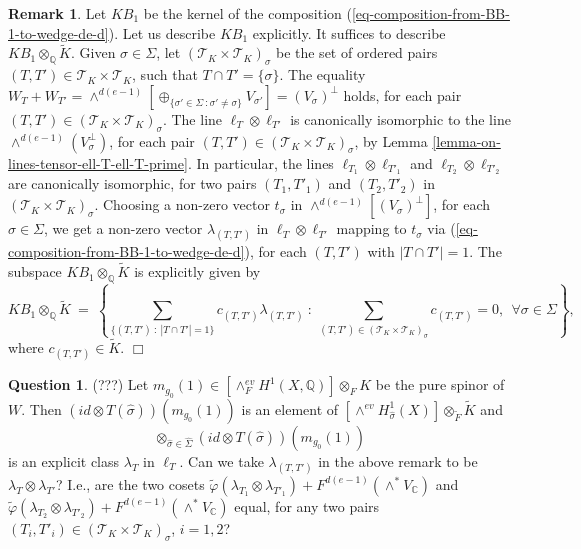 \documentclass[12pt]{amsart}
\numberwithin{equation}{subsection}
\theoremstyle{plain}
\theoremstyle{definition}
\newtheorem{rem}[thm]{Remark}
\newtheorem{question}[thm]{Question}
\newcommand{\CC}{{\mathbb C}}
\newcommand{\QQ}{{\mathbb Q}}
\newcommand{\T}{{\mathcal T}}
\newcommand{\EndProof}{\hfill  $\Box$}
\begin{document}
{\begin{rem}
Let $KB_1$ be the kernel of the composition (\ref{eq-composition-from-BB-1-to-wedge-de-d}).
Let us describe $KB_1$ explicitly.
It suffices to describe $KB_1\otimes_\QQ\tilde{K}$. Given $\sigma\in\Sigma$, let
$(\T_K\times \T_K)_{\sigma}$ be the set of ordered pairs $(T,T')\in \T_K\times \T_K$, such that $T\cap T'=\{\sigma\}$.
The equality $W_T+W_{T'}=\wedge^{d(e-1)}[\oplus_{\{\sigma'\in\Sigma \ : \sigma'\neq\sigma\}}V_{\sigma'}]=(V_{\sigma})^\perp$ holds, 
for each pair $(T,T')\in(\T_K\times \T_K)_{\sigma}$. The line $\ell_T\otimes\ell_{T'}$ is canonically isomorphic to the line 
$\wedge^{d(e-1)}(V_{\sigma}^\perp)$, for each pair $(T,T')\in(\T_K\times \T_K)_{\sigma}$, by
Lemma \ref{lemma-on-lines-tensor-ell-T-ell-T-prime}. In particular, the lines $\ell_{T_1}\otimes\ell_{T'_1}$
and $\ell_{T_2}\otimes\ell_{T'_2}$ are canonically isomorphic,
for two pairs $(T_1,T'_1)$ and $(T_2,T'_2)$ in $(\T_K\times \T_K)_{\sigma}$. Choosing a non-zero vector $t_{\sigma}$ in $\wedge^{d(e-1)}[(V_{\sigma})^\perp]$, for each
$\sigma\in\Sigma$, 
we get a non-zero vector $\lambda_{(T,T')}$ in $\ell_T\otimes\ell_{T'}$ mapping to $t_{\sigma}$ via (\ref{eq-composition-from-BB-1-to-wedge-de-d}), for each 
$(T,T')$ with $|T\cap T'|=1$. The subspace $KB_1\otimes_\QQ\tilde{K}$ is explicitly given by
\begin{equation}
\label{eq-explicit-equations-for-KB-1}
KB_1\otimes_\QQ\tilde{K} \ = \ 
\left\{
\sum_{\{(T,T') \ : \ |T\cap T'|=1\}}c_{(T,T')}\lambda_{(T,T')} \ : \
\sum_{(T,T')\in(\T_K\times \T_K)_{\sigma}}c_{(T,T')}=0, \ \ \forall \sigma\in\Sigma
\right\},
\end{equation}
where $c_{(T,T')}\in \tilde{K}$. 
\EndProof
\end{rem}

\begin{question}
(???) Let $m_{g_0}(1)\in[\wedge^{ev}_FH^1(X,\QQ)]\otimes_FK$ be the pure spinor of $W$.
Then $(id\otimes T(\hat{\sigma}))(m_{g_0}(1))$ is an element of 
$[\wedge^{ev}H^1_{\hat{\sigma}}(X)]\otimes_{\tilde{F}}\tilde{K}$ and 
\[
\otimes_{\hat{\sigma}\in\hat{\Sigma}}(id\otimes T(\hat{\sigma}))(m_{g_0}(1))
\]
is an explicit class $\lambda_T$ in $\ell_T$. 
Can we take $\lambda_{(T,T')}$ in the above remark to be $\lambda_T\otimes\lambda_{T'}$?
I.e., are the two cosets $\tilde{\varphi}(\lambda_{T_1}\otimes\lambda_{T'_1})+F^{d(e-1)}(\wedge^*V_\CC)$ and
$\tilde{\varphi}(\lambda_{T_2}\otimes\lambda_{T'_2})+F^{d(e-1)}(\wedge^*V_\CC)$
equal, for any two pairs $(T_i,T'_i)\in(\T_K\times\T_K)_\sigma$, $i=1,2$?
\end{question}

}
\end{document}
